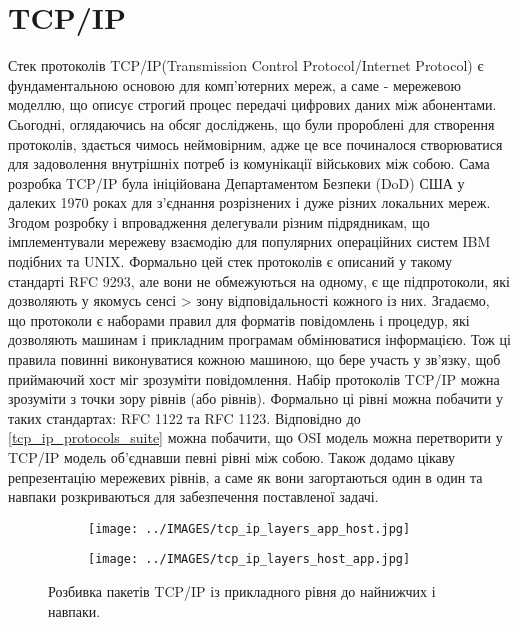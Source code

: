 \section{TCP/IP}
Стек протоколів TCP/IP(Transmission Control Protocol/Internet Protocol) є фундаментальною основою для комп'ютерних мереж, а саме - мережевою моделлю, що описує строгий процес передачі цифрових даних між абонентами. Сьогодні, оглядаючись на обсяг досліджень, що були пророблені для створення протоколів, здається чимось неймовірним, адже це все починалося створюватися для задоволення внутрішніх потреб із комунікації військових між собою.
Сама розробка TCP/IP була ініційована Департаментом Безпеки (DoD) США у далеких 1970 роках для з'єднання розрізнених і дуже різних локальних мереж. Згодом розробку і впровадження делегували різним підрядникам, що імплементували мережеву взаємодію для популярних операційних систем IBM подібних та UNIX. Формально цей стек протоколів є описаний у такому стандарті RFC 9293, але вони не обмежуються на одному, є ще підпротоколи, які дозволяють у якомусь сенсі > зону відповідальності кожного із них.
Згадаємо, що протоколи є наборами правил для форматів повідомлень і процедур, які дозволяють машинам і прикладним програмам обмінюватися інформацією. Тож ці правила повинні виконуватися кожною машиною, що бере участь у зв’язку, щоб приймаючий хост міг зрозуміти повідомлення. Набір протоколів TCP/IP можна зрозуміти з точки зору рівнів (або рівнів). Формально ці рівні можна побачити у таких стандартах: RFC 1122 та RFC 1123.
Відповідно до \ref{tcp_ip_protocols_suite} можна побачити, що OSI модель можна перетворити у TCP/IP модель об'єднавши певні рівні між собою.
Також додамо цікаву репрезентацію мережевих рівнів, а саме як вони загортаються один в один та навпаки розкриваються для забезпечення поставленої задачі.
\begin{figure}[ht]
\centering
    \begin{subfigure}[b]{0.5\textwidth}    
        \texttt{[image: ../IMAGES/tcp\_ip\_layers\_app\_host.jpg]}
        \caption{}
    \end{subfigure}%
    \begin{subfigure}[b]{0.5\textwidth}
        \texttt{[image: ../IMAGES/tcp\_ip\_layers\_host\_app.jpg]}
        \caption{}
    \end{subfigure}
    \caption{{Розбивка пакетів TCP/IP із прикладного рівня до найнижчих і навпаки.}}
    \label{fig_sudak}
\end{figure}

